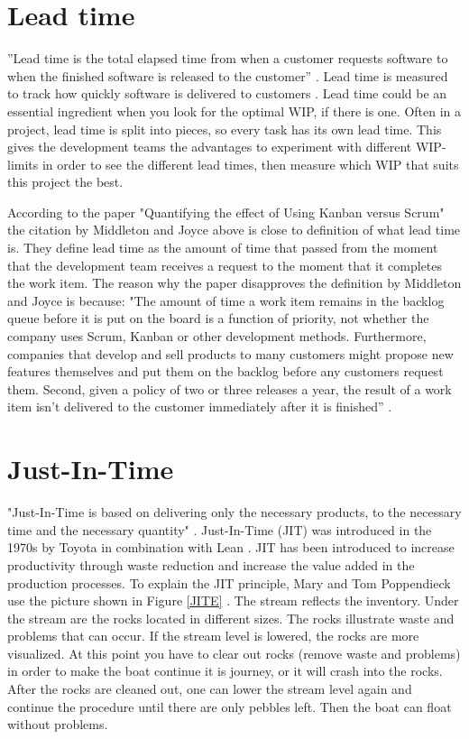 \documentclass[UKenglish]{ifimaster}  %
\begin{document}
\section {Lead time}
\label{sec:in:lt}
''Lead time is the total elapsed time from when a customer requests software to when the finished software is released to the customer'' \parencite{Joyce}. Lead time is measured to track how quickly software is delivered to customers \parencite{Joyce}. Lead time could be an essential ingredient when you look for the optimal WIP, if there is one.  Often in a project, lead time is split into pieces, so every task has its own lead time. This gives the development teams the advantages to experiment with different WIP-limits in order to see the different lead times, then measure which WIP that suits this project the best. 

According to the paper "Quantifying the effect of Using Kanban versus Scrum" \parencite{Dag} the citation by Middleton and Joyce above is close to definition of what lead time is. They define lead time as the amount of time that passed from the moment that the development team receives a request to the moment that it completes the work item. The reason why the paper disapproves the definition by Middleton and Joyce is because: "The amount of time a work item remains in the backlog queue before it is put on the board is a function of priority, not whether the company uses Scrum, Kanban or other development methods. Furthermore, companies that develop and sell products to many customers might propose new features themselves and put them on the backlog before any customers request them. Second, given a policy of two or three releases a year, the result of a work item isn't delivered to the customer immediately after it is finished'' \parencite{Dag}.



\section{Just-In-Time}
"Just-In-Time is based on delivering only the necessary products, to the necessary time and the necessary quantity" \parencite{JIT}.
Just-In-Time (JIT) was introduced in the 1970s by Toyota in combination with Lean \parencite{javadian2013just}.  JIT has been introduced to increase productivity through waste reduction and increase the value added in the production processes. To explain the JIT principle, Mary and Tom Poppendieck use the picture shown in Figure \ref{JITE}  \parencite{JIT} \parencite{Lean:2006}. The stream reflects the inventory.  Under the stream are the rocks located in different sizes. The rocks illustrate waste and problems that can occur.  If the stream level is lowered, the rocks are more visualized. At this point you have to clear out rocks (remove waste and problems) in order to make the boat continue it is journey, or it will crash into the rocks. After the rocks are cleaned out, one can lower the stream level again and continue the procedure until there are only pebbles left. Then the boat can float without problems.
\end{document}
